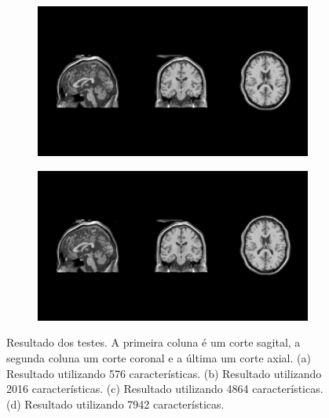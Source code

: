 \begin{figure}[H]
\begin{subfigure}[t]{0.5\textwidth}
      \label{fig:equalizedImage}
    \end{subfigure}
    \begin{subfigure}[t]{0.5\textwidth}
      \includegraphics[width=\textwidth]{figuras/result003.png}
      \label{fig:equalizedImage}
    \end{subfigure}
    \begin{subfigure}[t]{0.5\textwidth}
      \includegraphics[width=\textwidth]{figuras/result004.png}
      \label{fig:equalizedImage}
    \end{subfigure}
    \caption{Resultado dos testes. A primeira coluna é um corte sagital,
             a segunda coluna um corte coronal e a última um corte axial.
             (a) Resultado utilizando 576 características.
             (b) Resultado utilizando 2016 características.
             (c) Resultado utilizando 4864 características.
             (d) Resultado utilizando 7942 características.}
    \label{fig:equalization}
\end{figure}
